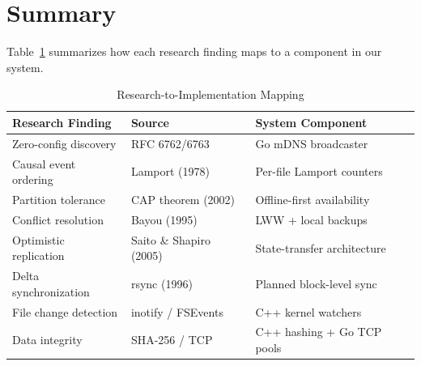 \section{Summary}

Table~\ref{tab:research-mapping} summarizes how each research finding maps to a component in our system.

\begin{table}[htbp]
\centering
\caption{Research-to-Implementation Mapping}
\label{tab:research-mapping}
\begin{tabular}{p{4.5cm} p{4cm} p{5cm}}
\toprule
\textbf{Research Finding} & \textbf{Source} & \textbf{System Component} \\
\midrule
Zero-config discovery & RFC 6762/6763 & Go mDNS broadcaster \\
\midrule
Causal event ordering & Lamport (1978) & Per-file Lamport counters \\
\midrule
Partition tolerance & CAP theorem (2002) & Offline-first availability \\
\midrule
Conflict resolution & Bayou (1995) & LWW + local backups \\
\midrule
Optimistic replication & Saito \& Shapiro (2005) & State-transfer architecture \\
\midrule
Delta synchronization & rsync (1996) & Planned block-level sync \\
\midrule
File change detection & inotify / FSEvents & C++ kernel watchers \\
\midrule
Data integrity & SHA-256 / TCP & C++ hashing + Go TCP pools \\
\bottomrule
\end{tabular}
\end{table}
